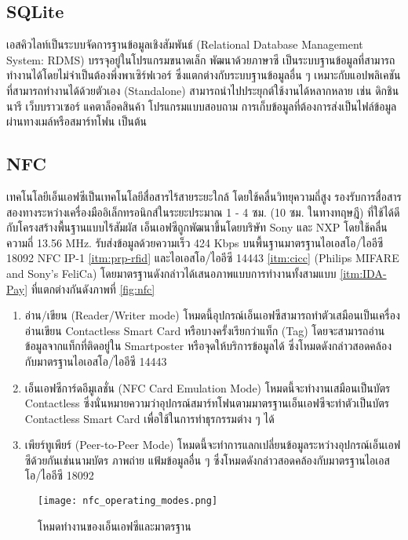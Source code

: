 \documentclass[a4paper]{article}
\begin{document}
\subsection{SQLite}
เอสคิวไลท์เป็นระบบจัดการฐานข้อมูลเชิงสัมพันธ์ (Relational Database Management System: RDMS) บรรจุอยู่ในโปรแกรมขนาดเล็ก พัฒนาด้วยภาษาซี เป็นระบบฐานข้อมูลที่สามารถทำงานได้โดยไม่จำเป็นต้องพึ่งพาเซิร์ฟเวอร์ ซึ่งแตกต่างกับระบบฐานข้อมูลอื่น ๆ เหมาะกับแอปพลิเคชันที่สามารถทำงานได้ด้วยตัวเอง (Standalone) สามารถนำไปประยุกต์ใช้งานได้หลากหลาย เช่น ดิกชินนารี เว็บบราวเซอร์ แคตาล็อคสินค้า โปรแกรมแบบสอบถาม การเก็บข้อมูลที่ต้องการส่งเป็นไฟล์ข้อมูลผ่านทางเมล์หรือสมาร์ทโฟน เป็นต้น

\subsection{NFC}
เทคโนโลยีเอ็นเอฟซีเป็นเทคโนโลยีสื่อสารไร้สายระยะใกล้ โดยใช้คลื่นวิทยุความถี่สูง รองรับการสื่อสารสองทางระหว่างเครื่องมืออิเล็กทรอนิกส์ในระยะประมาณ 1 - 4 ซม. (10 ซม. ในทางทฤษฎี) ที่ใช้ได้ดีกับโครงสร้างพื้นฐานแบบไร้สัมผัส เอ็นเอฟซีถูกพัฒนาขึ้นโดยบริษัท Sony และ NXP โดยใช้คลื่นความถี่ 13.56 MHz. รับส่งข้อมูลด้วยความเร็ว 424 Kbps บนพื้นฐานมาตรฐานไอเอสโอ/ไออีซี 18092 NFC IP-1 \ref{itm:prp-rfid} และไอเอสโอ/ไออีซี 14443 \ref{itm:cicc} (Philips MIFARE and Sony’s FeliCa) โดยมาตรฐานดังกล่าวได้เสนอภาพแบบการทำงานทั้งสามแบบ \ref{itm:IDA-Pay} ที่แตกต่างกันดังภาพที่ \ref{fig:nfc}

\begin{enumerate}
	\item อ่าน/เขียน (Reader/Writer mode) โหมดนี้อุปกรณ์เอ็นเอฟซีสามารถทำตัวเสมือนเป็นเครื่องอ่านเขียน Contactless Smart Card หรือบางครั้งเรียกว่าแท็ก (Tag) โดยจะสามารถอ่านข้อมูลจากแท็กที่ติดอยู่ใน Smartposter หรือจุดให้บริการข้อมูลได้ ซึ่งโหมดดังกล่าวสอดคล้องกับมาตรฐานไอเอสโอ/ไออีซี 14443
  	\item เอ็นเอฟซีการ์ดอีมูเลชั่น (NFC Card Emulation Mode) โหมดนี้จะทำงานเสมือนเป็นบัตร Contactless ซึ่งนั่นหมายความว่าอุปกรณ์สมาร์ทโฟนตามมาตรฐานเอ็นเอฟซีจะทำตัวเป็นบัตร Contactless Smart Card เพื่อใช้ในการทำธุรกรรมต่าง ๆ ได้
  	\item เพียร์ทูเพียร์ (Peer-to-Peer Mode) โหมดนี้จะทำการแลกเปลี่ยนข้อมูลระหว่างอุปกรณ์เอ็นเอฟซีด้วยกันเช่นนามบัตร ภาพถ่าย แฟ้มข้อมูลอื่น ๆ ซึ่งโหมดดังกล่าวสอดคล้องกับมาตรฐานไอเอสโอ/ไออีซี 18092
\end{enumerate}

\begin{figure}[ht!]
\centering
\texttt{[image: nfc\_operating\_modes.png]}
\caption{โหมดทำงานของเอ็นเอฟซีและมาตรฐาน} \label{fig:nfc}
\label{overflow}
\end{figure}
\end{document}
